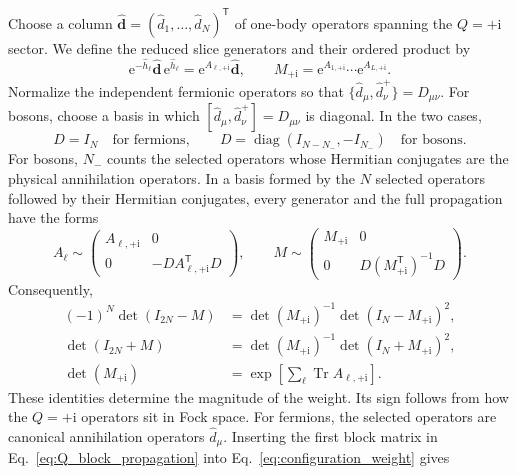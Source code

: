 \documentclass[onecolumn,aps,prb,amsmath,amssymb,superscriptaddress,longbibliography]{revtex4-2}
\newcommand{\Tr}{\operatorname{Tr}}
\newcommand{\diag}{\operatorname{diag}}
\newcommand{\ee}{\mathrm{e}}
\newcommand{\ii}{\mathrm{i}}
\newcommand{\trans}{\mathsf{T}}
\newcommand{\bb}[1]{\bm{#1}}
\begin{document}
Choose a column \(\hat{\bb d}=(\hat d_1,\ldots,\hat d_N)^\trans\) of one-body operators spanning the \(Q=+\ii\) sector.  We define the reduced slice generators and their ordered product by
\begin{equation}
    \ee^{-\hat h_\ell}\hat{\bb d}\,\ee^{\hat h_\ell}
    =\ee^{A_{\ell,+\ii}}\hat{\bb d},
    \qquad
    M_{+\ii}=\ee^{A_{1,+\ii}}\cdots\ee^{A_{L,+\ii}}.
    \label{eq:reduced_matrices}
\end{equation}
Normalize the independent fermionic operators so that \(\{\hat d_\mu,\hat d_\nu^+\}=D_{\mu\nu}\).  For bosons, choose a basis in which \([\hat d_\mu,\hat d_\nu^+]=D_{\mu\nu}\) is diagonal.  In the two cases,
\begin{equation}
    D=I_N\quad\text{for fermions},
    \qquad
    D=\diag(I_{N-N_-},-I_{N_-})\quad\text{for bosons}.
    \label{eq:reduced_commutator}
\end{equation}
For bosons, \(N_-\) counts the selected operators whose Hermitian conjugates are the physical annihilation operators.  In a basis formed by the \(N\) selected operators followed by their Hermitian conjugates, every generator and the full propagation have the forms
\begin{equation}
    A_\ell\sim
    \begin{pmatrix}
        A_{\ell,+\ii}&0\\
        0&-D A_{\ell,+\ii}^\trans D
    \end{pmatrix},
    \qquad
    M\sim
    \begin{pmatrix}
        M_{+\ii}&0\\
        0&D(M_{+\ii}^\trans)^{-1}D
    \end{pmatrix}.
    \label{eq:Q_block_propagation}
\end{equation}
Consequently,
\begin{align}
    (-1)^N\det(I_{2N}-M)
    &=\det(M_{+\ii})^{-1}\det(I_N-M_{+\ii})^2,
    \label{eq:boson_reduced_square}\\
    \det(I_{2N}+M)
    &=\det(M_{+\ii})^{-1}\det(I_N+M_{+\ii})^2,
    \label{eq:fermion_reduced_square}\\
    \det(M_{+\ii})
    &=\exp\!\left[\sum_\ell\Tr A_{\ell,+\ii}\right].
    \label{eq:reduced_det_exp}
\end{align}
These identities determine the magnitude of the weight.  Its sign follows from how the \(Q=+\ii\) operators sit in Fock space.  For fermions, the selected operators are canonical annihilation operators \(\hat d_\mu\).  Inserting the first block matrix in Eq.~\eqref{eq:Q_block_propagation} into Eq.~\eqref{eq:configuration_weight} gives
\end{document}
